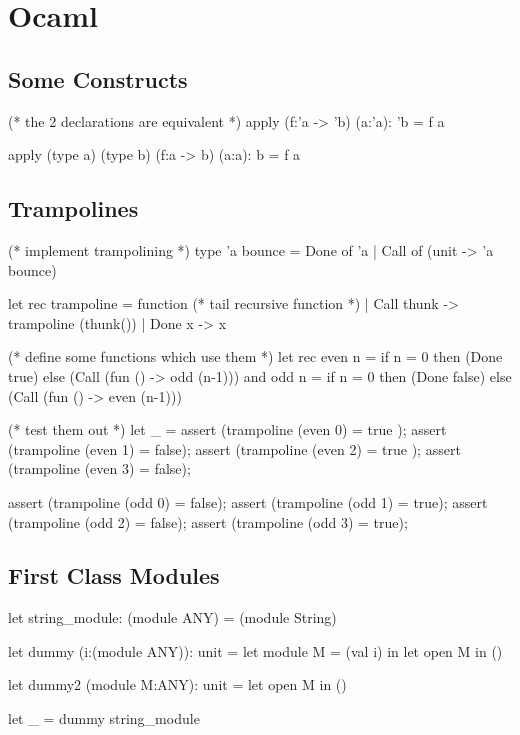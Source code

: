 \chapter{Ocaml}


\section{Some Constructs}

\begin{ocaml}
  (* the 2 declarations are equivalent *)
  apply (f:'a -> 'b) (a:'a): 'b =
    f a

  apply (type a) (type b) (f:a -> b) (a:a): b =
    f a
\end{ocaml}


\section{Trampolines}

\begin{ocaml}
  (* implement trampolining *)
  type 'a bounce = Done of 'a | Call of (unit -> 'a bounce)

  let rec trampoline = function  (* tail recursive function *)
    | Call thunk -> trampoline (thunk())
    | Done x     -> x

  (* define some functions which use them *)
  let rec
    even n = if n = 0 then (Done true) else (Call (fun () -> odd (n-1)))
  and
    odd n = if n = 0 then (Done false) else (Call (fun () -> even (n-1)))

  (* test them out *)
  let _ =
    assert (trampoline (even 0) = true );
    assert (trampoline (even 1) = false);
    assert (trampoline (even 2) = true );
    assert (trampoline (even 3) = false);

    assert (trampoline (odd 0) = false);
    assert (trampoline (odd 1) = true);
    assert (trampoline (odd 2) = false);
    assert (trampoline (odd 3) = true);
\end{ocaml}



\section{First Class Modules}


\begin{ocaml}
  let string_module: (module ANY) = (module String)

  let dummy (i:(module ANY)): unit =
    let module M = (val i) in
    let open M in
    ()

  let dummy2 (module M:ANY): unit =
    let open M in
    ()

  let _ = dummy string_module
\end{ocaml}



